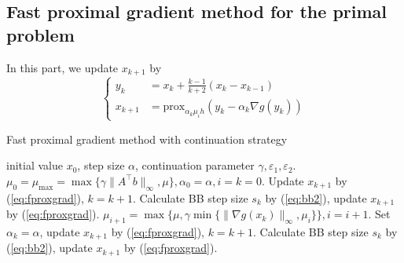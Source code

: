 \documentclass{article}
\numberwithin{equation}{section}
\numberwithin{figure}{section}
\begin{document}
\subsection{Fast proximal gradient method for the primal problem}
In this part, we update $x_{k+1}$ by
\begin{equation}
\begin{cases}
y_k &= x_k+\frac{k-1}{k+2}(x_k-x_{k-1})\\
x_{k+1}&=\mathrm{prox}_{\alpha_k \mu_i h}(y_k-\alpha_k \nabla g(y_k))
\end{cases}
    \label{eq:fproxgrad}
\end{equation}
\begin{algorithm}[!htbp]\caption{Fast proximal gradient method with continuation strategy}\label{alg:fproxgrad}
\begin{algorithmic}[1]
 initial value $x_0$, step size $\alpha$, continuation parameter $\gamma, \varepsilon_1, \varepsilon_2$.
\STATE $\mu_0=\mu_{\max}=\max\{\gamma\|A^\top b\|_\infty,\mu\},\alpha_0=\alpha, i = k=0$.
\STATE Update $x_{k+1}$ by (\ref{eq:fproxgrad}), $k = k+1$.
\STATE Calculate BB step size $s_k$ by (\ref{eq:bb2}), update $x_{k+1}$ by (\ref{eq:fproxgrad}).
\ENDFOR
\STATE $\mu_{i+1}=\max\{\mu, \gamma\min\{\|\nabla g(x_k)\|_\infty, \mu_i\} \},  i = i+1$.
\STATE Set $\alpha_k = \alpha$, update $x_{k+1}$ by (\ref{eq:fproxgrad}), $k=k+1$.
\ENDWHILE
{}
\STATE Calculate BB step size $s_k$ by (\ref{eq:bb2}), update $x_{k+1}$ by (\ref{eq:fproxgrad}).
\ENDFOR
\end{algorithmic}
\end{algorithm}
\end{document}
